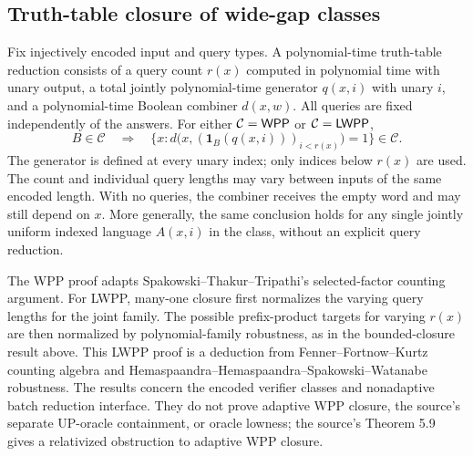 \begin{result}
\subsection{Truth-table closure of wide-gap classes}
Fix injectively encoded input and query types. A polynomial-time truth-table
reduction consists of a query count $r(x)$ computed in polynomial time with unary
output, a total jointly polynomial-time generator $q(x,i)$ with unary $i$, and a
polynomial-time Boolean combiner $d(x,w)$. All queries are fixed independently of
the answers. For either $\mathcal C=\mathsf{WPP}$ or $\mathcal C=\mathsf{LWPP}$,
\[
B\in\mathcal C\quad\Longrightarrow\quad
\bigl\{x:d\bigl(x,(\mathbf1_B(q(x,i)))_{i<r(x)}\bigr)=1\bigr\}\in\mathcal C.
\]
The generator is defined at every unary index; only indices below $r(x)$ are used.
The count and individual query lengths may vary between inputs of the same
encoded length. With no queries, the combiner receives the empty word and may
still depend on $x$. More generally, the same conclusion holds for any single
jointly uniform indexed language $A(x,i)$ in the class, without an explicit query
reduction.

The WPP proof adapts Spakowski--Thakur--Tripathi's selected-factor counting
argument.\citep[Theorem 5.6(a)]{SpakowskiThakurTripathi2005}
For LWPP, many-one closure first normalizes the varying query lengths for the
joint family. The possible prefix-product targets for varying $r(x)$ are then
normalized by polynomial-family robustness, as in the bounded-closure result
above. This LWPP proof is a deduction from Fenner--Fortnow--Kurtz counting algebra
and Hemaspaandra--Hemaspaandra--Spakowski--Watanabe robustness.
\citep{FennerFortnowKurtz1994,HemaspaandraEtAl2018}
The results concern the encoded verifier classes and nonadaptive batch reduction
interface. They do not prove adaptive WPP closure, the source's separate
UP-oracle containment, or oracle lowness; the source's Theorem 5.9 gives a
relativized obstruction to adaptive WPP closure.
\end{result}

